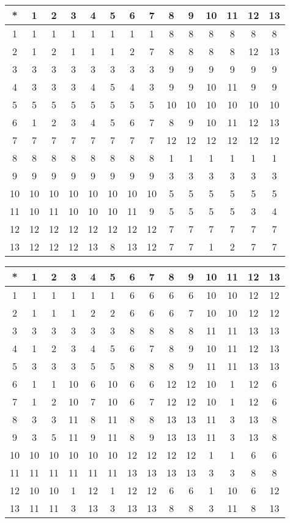 \begin{tabular}[t]{c|ccccccccccccc}
*&1&2&3&4&5&6&7&8&9&10&11&12&13 \\ \hline
    1&1&1&1&1&1&1&1&8&8&8&8&8&8 \\
    2&1&2&1&1&1&2&7&8&8&8&8&12&13 \\
    3&3&3&3&3&3&3&3&9&9&9&9&9&9 \\
    4&3&3&3&4&5&4&3&9&9&10&11&9&9 \\
    5&5&5&5&5&5&5&5&10&10&10&10&10&10 \\
    6&1&2&3&4&5&6&7&8&9&10&11&12&13 \\
    7&7&7&7&7&7&7&7&12&12&12&12&12&12 \\
    8&8&8&8&8&8&8&8&1&1&1&1&1&1 \\
    9&9&9&9&9&9&9&9&3&3&3&3&3&3 \\
    10&10&10&10&10&10&10&10&5&5&5&5&5&5 \\
    11&10&11&10&10&10&11&9&5&5&5&5&3&4 \\
    12&12&12&12&12&12&12&12&7&7&7&7&7&7 \\
    13&12&12&12&13&8&13&12&7&7&1&2&7&7 
\end{tabular}


\begin{tabular}[t]{c|ccccccccccccc}
*&1&2&3&4&5&6&7&8&9&10&11&12&13 \\ \hline
    1&1&1&1&1&1&6&6&6&6&10&10&12&12 \\
    2&1&1&1&2&2&6&6&6&7&10&10&12&12 \\
    3&3&3&3&3&3&8&8&8&8&11&11&13&13 \\
    4&1&2&3&4&5&6&7&8&9&10&11&12&13 \\
    5&3&3&3&5&5&8&8&8&9&11&11&13&13 \\
    6&1&1&10&6&10&6&6&12&12&10&1&12&6 \\
    7&1&2&10&7&10&6&7&12&12&10&1&12&6 \\
    8&3&3&11&8&11&8&8&13&13&11&3&13&8 \\
    9&3&5&11&9&11&8&9&13&13&11&3&13&8 \\
    10&10&10&10&10&10&12&12&12&12&1&1&6&6 \\
    11&11&11&11&11&11&13&13&13&13&3&3&8&8 \\
    12&10&10&1&12&1&12&12&6&6&1&10&6&12 \\
    13&11&11&3&13&3&13&13&8&8&3&11&8&13 
\end{tabular}


